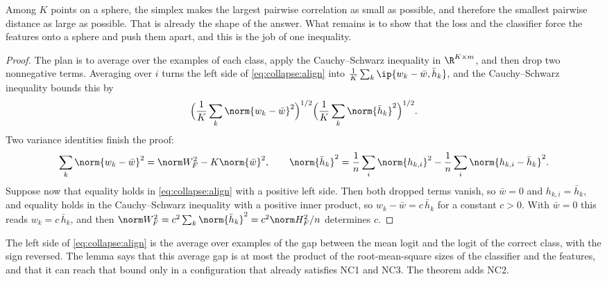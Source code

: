 \begin{refsection}
Among $K$ points on a sphere, the simplex makes the largest pairwise correlation as small as possible, and therefore the smallest pairwise distance as large as possible. That is already the shape of the answer. What remains is to show that the loss and the classifier force the features onto a sphere and push them apart, and this is the job of one inequality.


\begin{proof}
The plan is to average over the examples of each class, apply the Cauchy--Schwarz inequality in $\R^{K\times m}$, and then drop two nonnegative terms. Averaging over $i$ turns the left side of \eqref{eq:collapse:align} into $\frac1K\sum_k\ip{w_k-\bar w,\bar h_k}$, and the Cauchy--Schwarz inequality bounds this by
\[
  \Bigl(\frac1K\sum_k\norm{w_k-\bar w}^2\Bigr)^{1/2}\Bigl(\frac1K\sum_k\norm{\bar h_k}^2\Bigr)^{1/2}.
\]
Two variance identities finish the proof:
\[
  \sum_k\norm{w_k-\bar w}^2=\norm W_F^2-K\norm{\bar w}^2,\qquad
  \norm{\bar h_k}^2=\frac1n\sum_i\norm{h_{k,i}}^2-\frac1n\sum_i\norm{h_{k,i}-\bar h_k}^2 .
\]
Suppose now that equality holds in \eqref{eq:collapse:align} with a positive left side. Then both dropped terms vanish, so $\bar w=0$ and $h_{k,i}=\bar h_k$, and equality holds in the Cauchy--Schwarz inequality with a positive inner product, so $w_k-\bar w=c\,\bar h_k$ for a constant $c>0$. With $\bar w=0$ this reads $w_k=c\,\bar h_k$, and then $\norm W_F^2=c^2\sum_k\norm{\bar h_k}^2=c^2\norm H_F^2/n$ determines $c$.
\end{proof}

The left side of \eqref{eq:collapse:align} is the average over examples of the gap between the mean logit and the logit of the correct class, with the sign reversed. The lemma says that this average gap is at most the product of the root-mean-square sizes of the classifier and the features, and that it can reach that bound only in a configuration that already satisfies NC1 and NC3. The theorem adds NC2.


\end{refsection}
